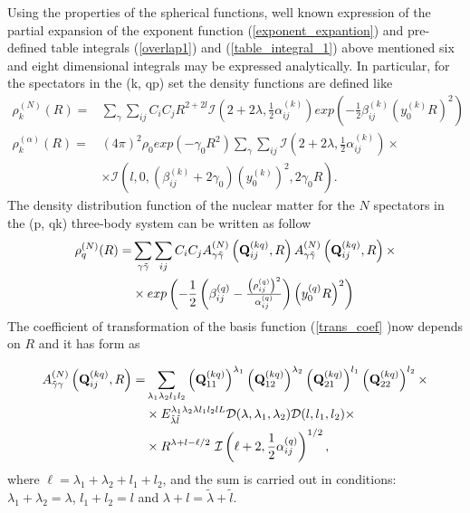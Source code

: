 \documentclass[
12pt, %
oneside, %
english, %
onehalfspacing, %
onehalfspacing, %
headsepline, %
]{MastersDoctoralThesis} %
\begin{document}
 Using the properties of the spherical functions, well known expression of the partial expansion of the exponent function (\ref{exponent_expantion}) and pre-defined table integrals (\ref{overlap1}) and (\ref{table_integral_1})
above mentioned six and eight dimensional integrals  may be expressed analytically. In particular, for the spectators in the (k, qp) set the density functions are defined like
\begin{align}
\rho_k^{(N)}(R)=&
\sum_{\gamma }
\sum_{i j} C_{i} C_j R^{2+2l} 
\mathcal{I} \left( 2+2\lambda, \frac{1}{2} \alpha^{(k)}_{ij} \right)
exp\left( - \frac{1}{2} \beta^{(k)}_{ij} \left( y^{(k)}_0 R \right)^2\right) \nonumber \\
\rho_{k}^{(\alpha)}(R)=&\left( 4 \pi \right)^2 \rho_0 exp\left( - \gamma_0 R^2 \right)  
\sum_{\gamma }
\sum_{ij}  \mathcal{I}\left( 2+2\lambda, \frac{1}{2}\alpha^{(k)}_{ij} \right) \times \nonumber \\
& \times
\mathcal{I} \left( l, 0, (\beta^{(k)}_{ij}+2 \gamma_0) \left( y^{(k)}_0\right)^2, 2\gamma_0 R \right).
\label{kpq_density}
\end{align}
The density distribution function of the nuclear matter for the $N$ spectators in the (p, qk) three-body system can be written as follow
\begin{align}
\rho_q^{(N)}(R)= &
\sum_{\gamma \tilde{\gamma}}
\sum_{ij}
C_i C_j
A^{(N)}_{\gamma\tilde{\gamma}}\left( {\bf Q}_{ij}^{(kq)}, R \right)
A^{(N)}_{\gamma\tilde{\gamma}}\left( {\bf Q}_{ij}^{(kq)}, R \right) 
\times \nonumber \\
& \times
exp \left( -\frac{1}{2} 
\left(  \beta^{(q)}_{ij} - \tfrac{\left(\rho^{(q)}_{ij}\right)^2}{\alpha^{(q)}_{ij}} \right) 
\left( y_0^{(q)} R\right)^2\right)
\label{pqk_density_N}
\end{align}
The coefficient of transformation of the basis function (\ref{trans_coef} )now depends on $R$ and it has form as

 \begin{align}
A^{(N)}_{\tilde{\gamma}\gamma}\left( {\bf Q}^{(kq)}_{ij}, R \right) = & \sum_{\lambda_1 \lambda_2 l_1 l_2} 
\left({\bf Q}_{11}^{(kq)} \right)^{\lambda_1} 
\left({\bf Q}_{12}^{(kq)} \right)^{\lambda_2} 
\left({\bf Q}_{21}^{(kq)} \right)^{l_1} 
\left({\bf Q}_{22}^{(kq)} \right)^{l_2} 
\times \nonumber
\\
& \times {E}^{\lambda_1 \lambda_2 \lambda l_1 l_2 l L}_{\tilde{\lambda} \tilde{l} } \mathcal{D}(\lambda,\lambda_1,\lambda_2) \mathcal{D}(l,l_1,l_2)
\times  \nonumber    \\
& \times R^{\lambda+l-\ell/2}~
\mathcal{I}\left( \ell +2
, \frac{1}{2} \alpha^{(q)}_{ij} \right)^{1/2},
\end{align}
where $\ell=\lambda_1+\lambda_2+l_1+l_2$, and the sum is carried out in conditions: $\lambda_1+\lambda_2=\lambda$, $l_1+l_2=l$ and $\lambda+l=\tilde{\lambda}+\tilde{l}$.
\end{document}

